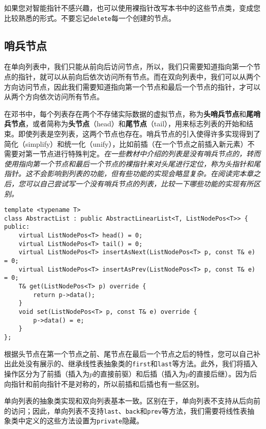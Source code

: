 如果您对智能指针不感兴趣，也可以使用裸指针改写本书中的这些节点类，变成您比较熟悉的形式。不要忘记\lstinline{delete}每一个创建的节点。

\subsection{哨兵节点}

在单向列表中，我们只能从前向后访问节点，所以，我们只需要知道指向第一个节点的指针，就可以从前向后依次访问所有节点。而在双向列表中，我们可以从两个方向访问节点，因此我们需要知道指向第一个节点和最后一个节点的指针，才可以从两个方向依次访问所有节点。

在邓书中，每个列表存在两个不存储实际数据的虚拟节点，称为\textbf{头哨兵节点}和\textbf{尾哨兵节点}，或者简称为\textbf{头节点}（head）和\textbf{尾节点}（tail），用来标志列表的开始和结束。即使列表是空列表，这两个节点也存在。哨兵节点的引入使得许多实现得到了简化（simplify）和统一化（unify），比如前插（在一个节点之前插入新元素）不需要对第一节点进行特殊判定。\textit{在一些教材中介绍的列表是没有哨兵节点的，转而使用指向第一个节点和最后一个节点的裸指针来对头尾进行定位，称为头指针和尾指针。这不会影响到列表的功能，但有些功能的实现会略显复杂。在阅读完本章之后，您可以自己尝试写一个没有哨兵节点的列表，比较一下哪些功能的实现有所区别。}

\begin{lstlisting}
template <typename T>
class AbstractList : public AbstractLinearList<T, ListNodePos<T>> {
public:
    virtual ListNodePos<T> head() = 0;
    virtual ListNodePos<T> tail() = 0;
    virtual ListNodePos<T> insertAsNext(ListNodePos<T> p, const T& e) = 0;
    virtual ListNodePos<T> insertAsPrev(ListNodePos<T> p, const T& e) = 0;
    T& get(ListNodePos<T> p) override {
        return p->data();
    }
    void set(ListNodePos<T> p, const T& e) override {
        p->data() = e;
    }
};
\end{lstlisting}

根据头节点在第一个节点之前、尾节点在最后一个节点之后的特性，您可以自己补出此处没有展示的、继承线性表抽象类的\lstinline{first}和\lstinline{last}等方法。此外，我们将插入操作区分为了前插（插入为$p$的直接前驱）和后插（插入为$p$的直接后继）。因为后向指针和前向指针不是对称的，所以前插和后插也有一些区别。

单向列表的抽象类实现和双向列表基本一致。区别在于，单向列表不支持从后向前的访问；因此，单向列表不支持\lstinline{last}、\lstinline{back}和\lstinline{prev}等方法，我们需要将线性表抽象类中定义的这些方法设置为\lstinline{private}隐藏。

